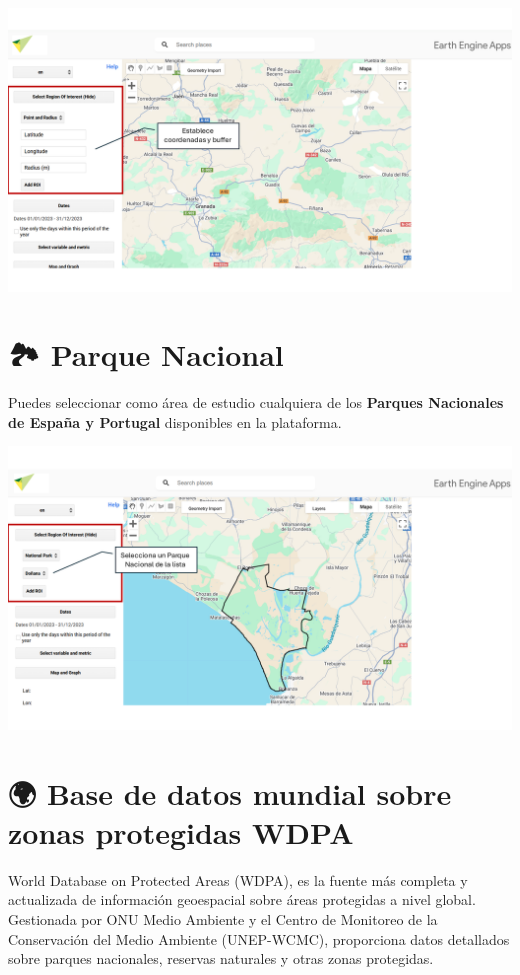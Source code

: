 \documentclass[
]{book}
\begin{document}
\includegraphics{assets/buffer_es.png}

\section{\texorpdfstring{\textbf{🏞️ Parque Nacional}}{🏞️ Parque Nacional}}\label{parque-nacional}

Puedes seleccionar como área de estudio cualquiera de los \textbf{Parques Nacionales de España y Portugal} disponibles en la plataforma.

\includegraphics{assets/np_es.png}

\section{\texorpdfstring{\textbf{🌍 Base de datos mundial sobre zonas protegidas WDPA}}{🌍 Base de datos mundial sobre zonas protegidas WDPA}}\label{base-de-datos-mundial-sobre-zonas-protegidas-wdpa}

World Database on Protected Areas (WDPA), es la fuente más completa y actualizada de información geoespacial sobre áreas protegidas a nivel global. Gestionada por ONU Medio Ambiente y el Centro de Monitoreo de la Conservación del Medio Ambiente (UNEP-WCMC), proporciona datos detallados sobre parques nacionales, reservas naturales y otras zonas protegidas.
\end{document}
